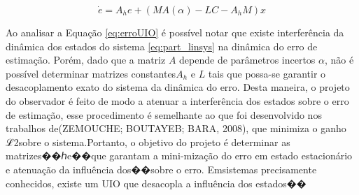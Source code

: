 \begin{equation} \label{eq:erroUIO}
    \dot{e}=A_he+(MA(\alpha)-LC-A_hM)x
\end{equation}

Ao analisar a Equação \ref{eq:erroUIO} é possível notar que existe interferência da dinâmica dos estados do sistema \ref{eq:part_linsys} na dinâmica do erro de estimação. Porém, dado que a matriz $A$ depende de parâmetros incertos $\alpha$, não é possível determinar matrizes constantes$A_h$ e $L$ tais que possa-se garantir o desacoplamento exato do sistema da dinâmica do erro. Desta maneira, o projeto do observador é feito de modo a atenuar a interferência dos estados sobre o erro de estimação, esse procedimento é semelhante ao que foi desenvolvido nos trabalhos de(ZEMOUCHE; BOUTAYEB; BARA, 2008), que minimiza o ganho ℒ2sobre o sistema.Portanto, o objetivo do projeto é determinar as matrizes��ℎe��que garantam a mini-mização do erro em estado estacionário e atenuação da influência dos��sobre o erro. Emsistemas precisamente conhecidos, existe um UIO que desacopla a influência dos estados��
